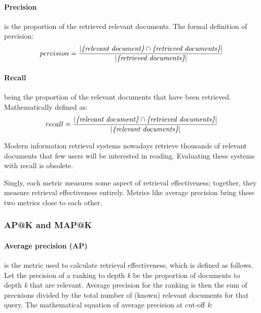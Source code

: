 \paragraph*{Precision} is the proportion of the retrieved relevant documents. The formal definition of percision:
\begin{equation}
	percision = \frac{|\emph{\{relevant document\}} \cap \emph{\{retrieved documents\}}|}{|\emph{\{retrieved documents\}}|}
	\label{eq:percision}
\end{equation}

\paragraph*{Recall} being the proportion of the relevant documents that have been retrieved. Mathematically defined as:
\begin{equation}
	recall = \frac{|\emph{\{relevant document\}} \cap \emph{\{retrieved documents\}}|}{|\emph{\{relevant documents\}}|}
	\label{eq:recall}
\end{equation}

Modern information retrieval systems nowadays retrieve thousands of relevant documents that few users will be interested in reading. Evaluating these systems with recall is obsolete.

Singly, each metric measures some aspect of retrieval effectiveness; together, they measure retrieval effectiveness entirely. Metrics like average precision bring these two metrics close to each other.

\subsubsection{AP@K and MAP@K}
\label{AP@K and MAP@K}
\paragraph*{Average precision (AP)} is the metric used to calculate retrieval effectiveness, which is defined as follows. 
Let the precision of a ranking to depth \emph{k} be
the proportion of documents to depth \emph{k} that are relevant.
Average precision for the ranking is then the sum of precisions divided by the total number of (known) relevant documents for that query.
The mathematical equation of average precision at cut-off \emph{k}:


